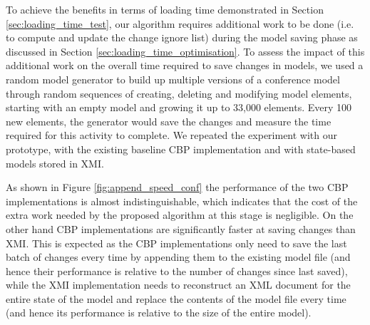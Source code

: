 \documentclass{llncs}
\begin{document}
To achieve the benefits in terms of loading time demonstrated in Section \ref{sec:loading_time_test}, our algorithm requires additional work to be done (i.e. to compute and update the change ignore list) during the model saving phase as discussed in Section \ref{sec:loading_time_optimisation}. To assess the impact of this additional work on the overall time required to save changes in models, we used a random model generator to build up multiple versions of a conference model through random sequences of creating, deleting and modifying model elements, starting with an empty model and growing it up to 33,000 elements. Every 100 new elements, the generator would save the changes and measure the time required for this activity to complete. We repeated the experiment with our prototype, with the existing baseline CBP implementation and with state-based models stored in XMI.


As shown in Figure \ref{fig:append_speed_conf} the performance of the two CBP implementations is almost indistinguishable, which indicates that the cost of the extra work needed by the proposed algorithm at this stage is negligible. On the other hand CBP implementations are significantly faster at saving changes than XMI. This is expected as the CBP implementations only need to save the last batch of changes every time by appending them to the existing model file (and hence their performance is relative to the number of changes since last saved), while the XMI implementation needs to reconstruct an XML document for the entire state of the model and replace the contents of the model file every time (and hence its performance is relative to the size of the entire model). 

\end{document}
